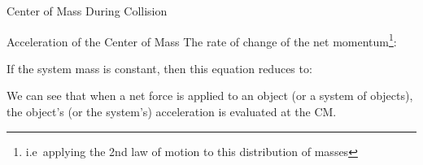 \documentclass[12pt,compress,aspectratio=169]{beamer}
\begin{document}
\begin{frame}{Center of Mass During Collision}
\begin{center}
    \vspace{.3in}
  \end{center}
\end{frame}


\begin{frame}{Acceleration of the Center of Mass}
  The rate of change of the net momentum\footnote{i.e\ applying the 2nd law of
  motion to this distribution of masses}:
  

  If the system mass is constant, then this equation reduces to:

  
  We can see that when a net force is applied to an object (or a system of
  objects), the object's (or the system's)  acceleration is evaluated at the
  CM.
  \vspace{.3in}
\end{frame}



\end{document}
